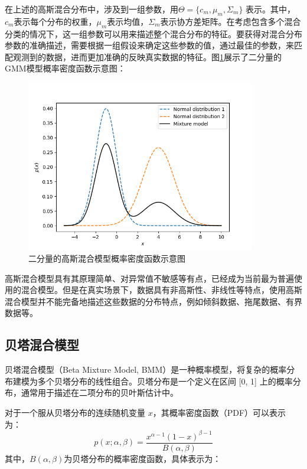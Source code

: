 在上述的高斯混合分布中，涉及到一组参数，用$\Theta = \{c_m, \mu_m, \Sigma_m\}$ 表示。其中，$c_m$表示每个分布的权重，$\mu_m$表示均值，$\Sigma_m$表示协方差矩阵。在考虑包含多个混合分类的情况下，这一组参数可以用来描述整个混合分布的特征。要获得对混合分布参数的准确描述，需要根据一组假设来确定这些参数的值，通过最佳的参数，来匹配观测到的数据，进而更加准确的反映真实数据的特征。图\ref{GMM}展示了二分量的GMM模型概率密度函数示意图：

\begin{figure}[ht!]
    \centering
    \includegraphics[width=10cm]{pic/chapter4/GMM.png}
    \caption{二分量的高斯混合模型概率密度函数示意图}
    \label{GMM}
\end{figure}

高斯混合模型具有其原理简单、对异常值不敏感等有点，已经成为当前最为普遍使用的混合模型。但是在真实场景下，数据具有非高斯性、非线性等特点，使用高斯混合模型并不能完备地描述这些数据的分布特点，例如倾斜数据、拖尾数据、有界数据等。

\subsection{贝塔混合模型}
贝塔混合模型（Beta Mixture Model, BMM）是一种概率模型，将复杂的概率分布建模为多个贝塔分布的线性组合。贝塔分布是一个定义在区间 [0, 1] 上的概率分布，通常用于描述在二项分布的贝叶斯估计中。

对于一个服从贝塔分布的连续随机变量 $x$，其概率密度函数（PDF）可以表示为：
\begin{equation}
    \label{eq:beta1}
    p(x; \alpha, \beta) = \frac{x^{\alpha - 1} (1 - x)^{\beta - 1}}{B(\alpha, \beta)}
\end{equation}
其中，$B(\alpha, \beta)$为贝塔分布的概率密度函数，具体表示为：


